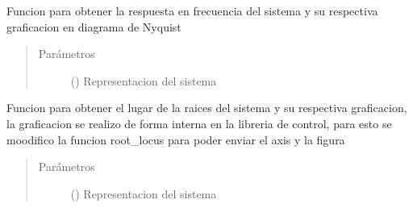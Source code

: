 \documentclass[letterpaper,10pt,spanish]{sphinxmanual}
\begin{document}

\begin{fulllineitems}
\label{\detokenize{codigos/rutinas_analisis:rutinas_analisis.rutina_nyquist_plot}}
Funcion para obtener la respuesta en frecuencia del sistema y su respectiva graficacion en diagrama de Nyquist
\begin{quote}\begin{description}
\item[{Parámetros}] \leavevmode
{} () \textendash{} Representacion del sistema

\end{description}\end{quote}

\end{fulllineitems}


\begin{fulllineitems}
\label{\detokenize{codigos/rutinas_analisis:rutinas_analisis.rutina_root_locus_plot}}
Funcion para obtener el lugar de la raices del sistema y su respectiva graficacion, la graficacion se realizo de forma interna en la libreria de control, para esto se moodifico la funcion root\_locus para poder enviar el axis y la figura
\begin{quote}\begin{description}
\item[{Parámetros}] \leavevmode
{} () \textendash{} Representacion del sistema

\end{description}\end{quote}

\end{fulllineitems}

\end{document}
